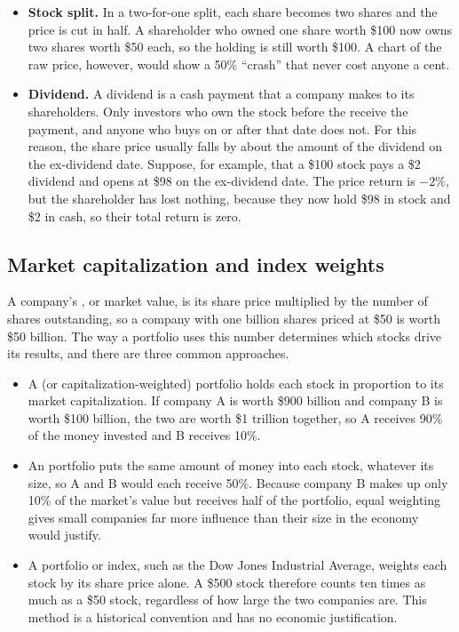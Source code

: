\begin{itemize}
  \item \textbf{Stock split.} In a two-for-one split, each share becomes two shares and the price is cut in half. A shareholder who owned one share worth \$100 now owns two shares worth \$50 each, so the holding is still worth \$100. A chart of the raw price, however, would show a 50\% ``crash'' that never cost anyone a cent.
  \item \textbf{Dividend.} A dividend is a cash payment that a company makes to its shareholders. Only investors who own the stock before the  receive the payment, and anyone who buys on or after that date does not. For this reason, the share price usually falls by about the amount of the dividend on the ex-dividend date. Suppose, for example, that a \$100 stock pays a \$2 dividend and opens at \$98 on the ex-dividend date. The price return is $-2$\%, but the shareholder has lost nothing, because they now hold \$98 in stock and \$2 in cash, so their total return is zero.
\end{itemize}

\subsection{Market capitalization and index weights}

A company's , or market value, is its share price multiplied by the number of shares outstanding, so a company with one billion shares priced at \$50 is worth \$50 billion. The way a portfolio uses this number determines which stocks drive its results, and there are three common approaches.

\begin{itemize}
  \item A  (or capitalization-weighted) portfolio holds each stock in proportion to its market capitalization. If company A is worth \$900 billion and company B is worth \$100 billion, the two are worth \$1 trillion together, so A receives 90\% of the money invested and B receives 10\%.
  \item An  portfolio puts the same amount of money into each stock, whatever its size, so A and B would each receive 50\%. Because company B makes up only 10\% of the market's value but receives half of the portfolio, equal weighting gives small companies far more influence than their size in the economy would justify.
  \item A  portfolio or index, such as the Dow Jones Industrial Average, weights each stock by its share price alone. A \$500 stock therefore counts ten times as much as a \$50 stock, regardless of how large the two companies are. This method is a historical convention and has no economic justification.
\end{itemize}

